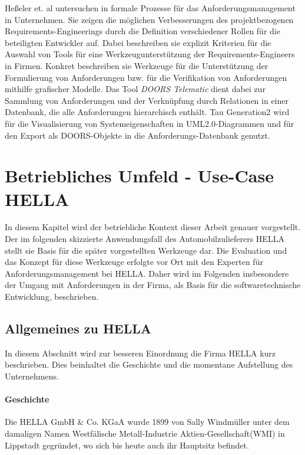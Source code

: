 \documentclass[12pt]{report}
\begin{document}
\vspace{12pt}

Heßeler et. al untersuchen in \cite{he13} formale Prozesse für das Anforderungsmanagement in Unternehmen. Sie zeigen die möglichen Verbesserungen  des projektbezogenen Requirements-Engineerings durch die Definition verschiedener Rollen für die beteiligten Entwickler auf. Dabei beschreiben sie explizit Kriterien für die Auswahl von Tools für eine Werkzeugunterstützung der Requirements-Engineers in Firmen. Konkret beschreiben sie Werkzeuge für die Unterstützung der Formulierung von Anforderungen bzw. für die Verifikation von Anforderungen mithilfe grafischer Modelle. Das Tool \textit{DOORS Telematic} dient dabei zur Sammlung von Anforderungen und der Verknüpfung durch Relationen in einer Datenbank, die alle Anforderungen hierarchisch enthält. Tau Generation2 wird für die Visualisierung von Systemeigenschaften in UML2.0-Diagrammen und für den Export als DOORS-Objekte in die Anforderungs-Datenbank genutzt.

\chapter{Betriebliches Umfeld - Use-Case HELLA}
In diesem Kapitel wird der betriebliche Kontext dieser Arbeit genauer vorgestellt. Der im folgenden skizzierte Anwendungsfall des Automobilzulieferers HELLA stellt sie Basis für die später vorgestellten Werkzeuge dar. Die Evaluation und das Konzept für diese Werkzeuge erfolgte vor Ort mit den Experten für Anforderungsmanagement bei HELLA. Daher wird im Folgenden insbesondere der Umgang mit Anforderungen in der Firma, als Basis für die softwaretechnische Entwicklung, beschrieben.

\section{Allgemeines zu HELLA}
In diesem Abschnitt wird zur besseren Einordnung die Firma HELLA kurz beschrieben. Dies beinhaltet die Geschichte und die momentane Aufstellung des Unternehmens. \cite{he18} \cite{he19}

\subsubsection{Geschichte}
Die HELLA GmbH \& Co. KGaA wurde 1899 von Sally Windmüller unter dem damaligen Namen \glqq Westfälische Metall-Industrie Aktien-Gesellschaft(WMI)\grqq{} in Lippstadt gegründet, wo sich bis heute auch ihr Hauptsitz befindet. 
\end{document}
